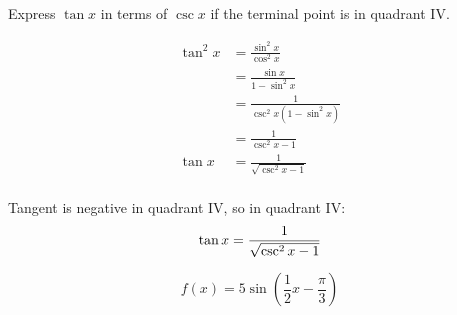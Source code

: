 \documentclass{exam}
\begin{document}
\begin{questions}

      \question[10] Express $\tan x$ in terms of $\csc x$ if the terminal point is in quadrant IV.
        \begin{solution}
          \begin{align*}
            \tan^2 x & = \frac{\sin^2 x}{\cos^2 x} \\
                     & = \frac{\sin x}{1 - \sin^2 x} \\
                     & = \frac{1}{\csc^2 x (1 - \sin^2 x)} \\
                     & = \frac{1}{\csc^2 x - 1} \\
            \tan x   & = \frac{1}{\sqrt{\csc^2 x - 1}} \\
          \end{align*}

          Tangent is negative in quadrant IV, so in quadrant IV:
          \[
            \tan x = \frac{1}{\sqrt{\csc^2 x - 1}} \\
          \]

        \end{solution}

      \question 
        \[
          f(x) = 5 \sin \left( \frac{1}{2} x - \frac{\pi}{3} \right)
        \]

\end{questions}
\end{document}
